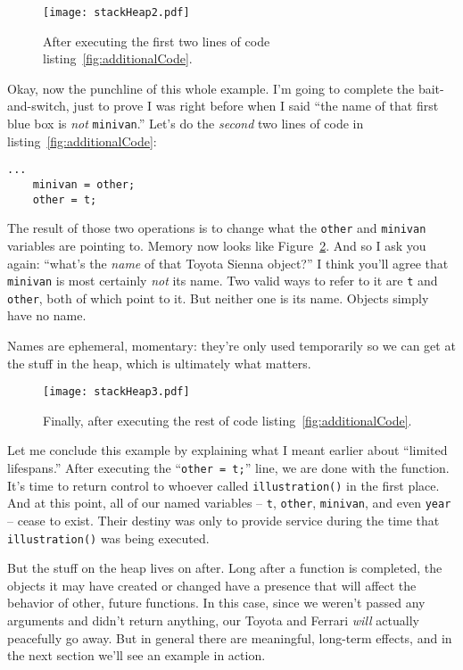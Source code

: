 \begin{figure}
\centering
\texttt{[image: stackHeap2.pdf]}   %
\caption{After executing the first two lines of code
listing~\ref{fig:additionalCode}.}
\label{fig:stackHeap2}
\end{figure}


Okay, now the punchline of this whole example. I'm going to complete the
bait-and-switch, just to prove I was right before when I said ``the name of
that first blue box is \textit{not} \texttt{minivan}.'' Let's do the
\textit{second} two lines of code in listing~\ref{fig:additionalCode}:

\begin{Verbatim}[fontsize=\small,samepage=true,frame=single]
    ...
    minivan = other;
    other = t;
\end{Verbatim}

The result of those two operations is to change what the \texttt{other} and
\texttt{minivan} variables are pointing to. Memory now looks like
Figure~\ref{fig:stackHeap3}. And so I ask you again: ``what's the
\textit{name} of that Toyota Sienna object?'' I think you'll agree that
\texttt{minivan} is most certainly \textit{not} its name. Two valid ways to
refer to it are \texttt{t} and \texttt{other}, both of which point to it. But
neither one is its name. Objects simply have no name.

Names are ephemeral, momentary: they're only used temporarily so we can get at
the stuff in the heap, which is ultimately what matters.

\begin{figure}
\centering
\texttt{[image: stackHeap3.pdf]}   %
\caption{Finally, after executing the rest of code
listing~\ref{fig:additionalCode}.}
\label{fig:stackHeap3}
\end{figure}

Let me conclude this example by explaining what I meant earlier about
``limited lifespans.'' After executing the ``\texttt{other = t;}'' line, we are
done with the function. It's time to return control to whoever called
\texttt{illustration()} in the first place. And at this point, all of our
named variables -- \texttt{t}, \texttt{other}, \texttt{minivan}, and even
\texttt{year} -- cease to exist. Their destiny was only to provide service
during the time that \texttt{illustration()} was being executed. 

But the stuff on the heap lives on after. Long after a function is completed,
the objects it may have created or changed have a presence that will affect
the behavior of other, future functions. In this case, since we weren't passed
any arguments and didn't return anything, our Toyota and Ferrari \textit{will}
actually peacefully go away. But in general there are meaningful, long-term
effects, and in the next section we'll see an example in action.

